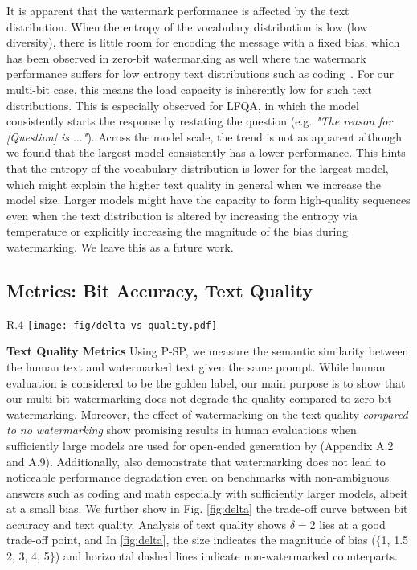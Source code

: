It is apparent that the watermark performance is affected by the text distribution. When the entropy of the vocabulary distribution is low (low diversity), there is little room for encoding the message with a fixed bias, which has been observed in zero-bit watermarking as well where the watermark performance suffers for low entropy text distributions such as coding~\citep{lee2023wrote, kirchenbauer2023reliability}. For our multi-bit case, this means the load capacity is inherently low for such text distributions. This is especially observed for LFQA, in which the model consistently starts the response by restating the question (e.g. \textit{"The reason for [Question] is $\dots$"}). Across the model scale, the trend is not as apparent although we found that the largest model consistently has a lower performance. This hints that the entropy of the vocabulary distribution is lower for the largest model, which might explain the higher text quality in general when we increase the model size. Larger models might have the capacity to form high-quality sequences even when the text distribution is altered by increasing the entropy via temperature or explicitly increasing the magnitude of the bias during watermarking. We leave this as a future work.  



\subsection{Metrics: Bit Accuracy, Text Quality}\label{appendix:bit-acc-as-metric}

\begin{wrapfigure}{R}{.4\textwidth}
    \texttt{[image: fig/delta-vs-quality.pdf]}
    \caption{Text quality vs. $\delta$ across bias@T=100,b=8}
    \label{fig:delta}
\end{wrapfigure}

\textbf{Text Quality Metrics} Using P-SP, we measure the semantic similarity between the human text and watermarked text given the same prompt. While human evaluation is considered to be the golden label, our main purpose is to show that our multi-bit watermarking does not degrade the quality compared to zero-bit watermarking. Moreover, the effect of watermarking on the text quality \textit{compared to no watermarking} show promising results in human evaluations when sufficiently large models are used for open-ended generation by \citealt{kirchenbauer2023reliability} (Appendix A.2 and A.9). Additionally, \citet{fernandez2023three} also demonstrate that watermarking does not lead to noticeable performance degradation even on benchmarks with non-ambiguous answers such as coding and math especially with sufficiently larger models, albeit at a small bias. We further show in Fig. \ref{fig:delta} the trade-off curve between bit accuracy and text quality. Analysis of text quality shows $\delta=2$ lies at a good trade-off point, and  In \ref{fig:delta}, the size indicates the magnitude of bias ($\{$1, 1.5 2, 3, 4, 5$\}$) and horizontal dashed lines indicate non-watermarked counterparts.




